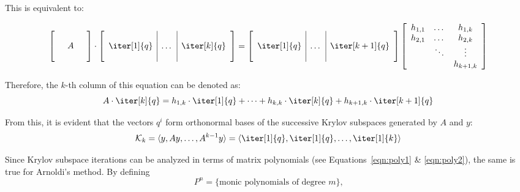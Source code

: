 \noindent This is equivalent to:

\begin{equation}
  \left[
    \begin{array}{ccc}
      &  & \\
      & A & \\
      &  & \\
    \end{array}
  \right] \cdot
  \left[
    \begin{array}{c|c|c}
      & & \\
      \iter[1]{q} &\dots & \iter[k]{q} \\
      & & \\
    \end{array}
  \right] = 
  \left[
    \begin{array}{c|c|c}
      & & \\
      \iter[1]{q} &\dots & \iter[k+1]{q} \\
      & & \\
    \end{array}
  \right]
  \left[
    \begin{array}{ccc}
      h_{1,1} & \dots & h_{1,k} \\
      h_{2,1} & \dots &  h_{2,k}\\
      & \ddots & \vdots \\
      & & h_{k+1, k}  \\
    \end{array}
  \right] 
\end{equation}

\noindent Therefore, the $k$-th column of this equation can be denoted as:
\begin{equation}
    A \cdot \iter[k]{q} = h_{1,k}\cdot \iter[1]{q}+ \cdots + h_{k,k}\cdot \iter[k]{q} + h_{k+1,k}\cdot \iter[k+1]{q}
\end{equation}

\noindent From this, it is evident that the vectors $q^i$ form orthonormal bases of the successive Krylov subspaces generated by $A$ and $y$:
\begin{equation}
\label{eqn:krylov_space}
    \mathcal{K}_k=\langle y, Ay, \dots , A^{k-1}y\rangle = \langle \iter[1]{q},\iter[1]{q}, \dots , \iter[1]{k}\rangle
\end{equation}

\noindent Since Krylov subspace iterations can be analyzed in terms of matrix polynomials (see Equations~\hyperref[eqn:poly1]{\ref{eqn:poly1}} \& \hyperref[eqn:poly2]{\ref{eqn:poly2}}), the same is true for Arnoldi's method. By defining 
\begin{equation}
\label{eqn:arnoldi_poly}
    P^n = \{\text{monic polynomials of degree }m\}\text{,}
\end{equation}

